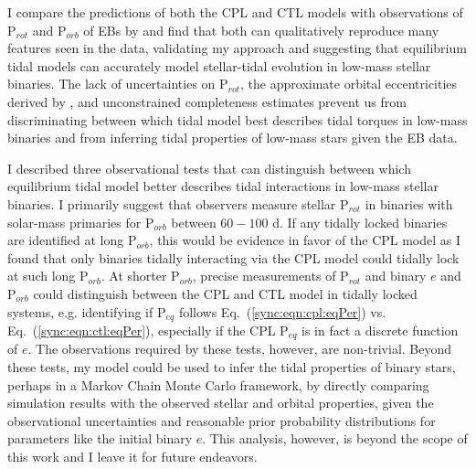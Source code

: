 I compare the predictions of both the CPL and CTL models with observations of P$_{rot}$ and P$_{orb}$ of \kepler EBs by \citet{Lurie2017} and find that both can qualitatively reproduce many features seen in the data, validating my approach and suggesting that equilibrium tidal models can accurately model stellar-tidal evolution in low-mass stellar binaries. The lack of uncertainties on P$_{rot}$, the approximate orbital eccentricities derived by \citet{Lurie2017}, and unconstrained completeness estimates prevent us from discriminating between which tidal model best describes tidal torques in low-mass binaries and from inferring tidal properties of low-mass stars given the \kepler EB data.  

I described three observational tests that can distinguish between which equilibrium tidal model better describes tidal interactions in low-mass stellar binaries. I primarily suggest that observers measure stellar P$_{rot}$ in binaries with solar-mass primaries for P$_{orb}$ between $60-100$ d. If any tidally locked binaries are identified at long P$_{orb}$, this would be evidence in favor of the CPL model as I found that only binaries tidally interacting via the CPL model could tidally lock at such long P$_{orb}$. At shorter P$_{orb}$, precise measurements of P$_{rot}$ and binary $e$ and P$_{orb}$ could distinguish between the CPL and CTL model in tidally locked systems, e.g. identifying if P$_{eq}$ follows Eq.~(\ref{sync:eqn:cpl:eqPer}) vs. Eq.~(\ref{sync:eqn:ctl:eqPer}), especially if the CPL P$_{eq}$ is in fact a discrete function of $e$. The observations required by these tests, however, are non-trivial. Beyond these tests, my model could be used to infer the tidal properties of binary stars, perhaps in a Markov Chain Monte Carlo framework, by directly comparing simulation results with the observed stellar and orbital properties, given the observational uncertainties and reasonable prior probability distributions for parameters like the initial binary $e$. This analysis, however, is beyond the scope of this work and I leave it for future endeavors.

